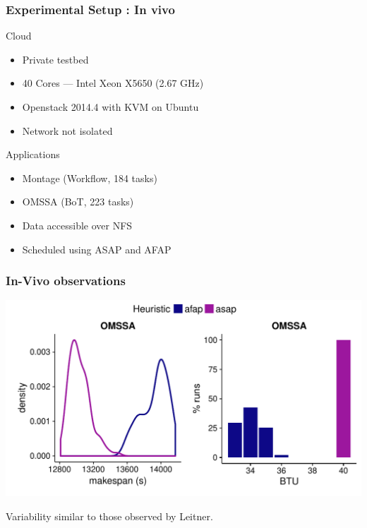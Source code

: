 \documentclass{beamer}
\begin{document}
\begin{frame}
	\frametitle{Experimental Setup : In vivo}
	\begin{block}{Cloud}
	\begin{itemize}
		\item{} Private testbed
		\item{} 40 Cores --- Intel Xeon X5650 (2.67 GHz)
		\item{} Openstack 2014.4 with KVM on Ubuntu
		\item{} Network not isolated
	\end{itemize}
	\end{block}
	\begin{block}{Applications}
	\begin{itemize}
		\item{} Montage (Workflow, 184 tasks)
		\item{} OMSSA (BoT, 223 tasks)
		\item{} Data accessible over NFS
		\item{} Scheduled using ASAP and AFAP
	\end{itemize}
	\end{block}
\end{frame}

\begin{frame}
	\frametitle{In-Vivo observations}
	\includegraphics[width=\textwidth]{gfx/real.pdf}
	\pause
	\begin{center}
	Variability similar to those observed by Leitner.
	\end{center}
\end{frame}
\end{document}
